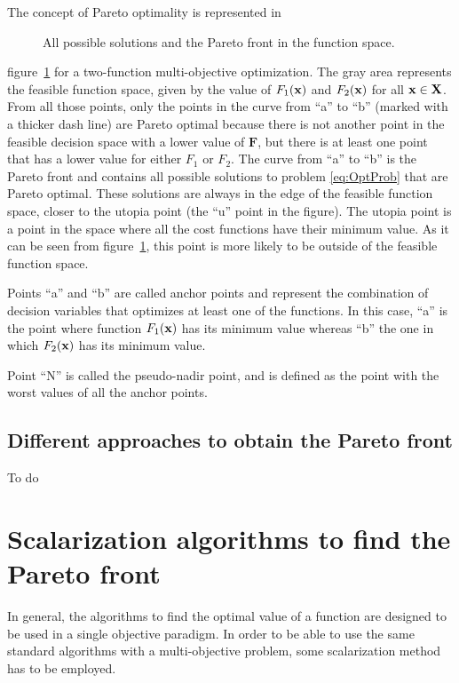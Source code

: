 The concept of Pareto optimality is represented in %
%
\begin{figure}
	\centering
	
	\caption{All possible solutions and the Pareto front in the function space.}
	\label{fig:planoFun01}
\end{figure}
%
figure~\ref{fig:planoFun01} for a two-function multi-objective optimization. The gray area represents the feasible function space, given by the value of $F_1(\mathbf{x})$ and $F_2(\mathbf{x})$ for all $\mathbf{x} \in \mathbf{X}$. From all those points, only the points in the curve from ``a'' to ``b'' (marked with a thicker dash line) are Pareto optimal because there is not another point in the feasible decision space with a lower value of $\mathbf{F}$, but there is at least one point that has a lower value for either $F_1$ or $F_2$. The curve from ``a'' to ``b'' is the Pareto front and contains all possible solutions to problem \eqref{eq:OptProb} that are Pareto optimal. These solutions are always in the edge of the feasible function space, closer to the utopia point (the ``u'' point in the figure). The utopia point is a point in the space where all the cost functions have their minimum value. As it can be seen from figure~\ref{fig:planoFun01}, this point is more likely to be outside of the feasible function space.

Points ``a'' and ``b'' are called anchor points and represent the combination of decision variables that optimizes at least one of the functions. In this case, ``a'' is the point where function $F_1(\mathbf{x})$ has its minimum value whereas ``b'' the one in which $F_2(\mathbf{x})$ has its minimum value.

Point ``N'' is called the pseudo-nadir point, and is defined as the point with the worst values of all the anchor points.
\subsection{Different approaches to obtain the Pareto front}
To do
\section{Scalarization algorithms to find the Pareto front}
\label{sec:design-methodologies}

In general, the algorithms to find the optimal value of a function are designed to be used in a single objective paradigm. In order to be able to use the same standard algorithms with a multi-objective problem, some scalarization method has to be employed.
%
